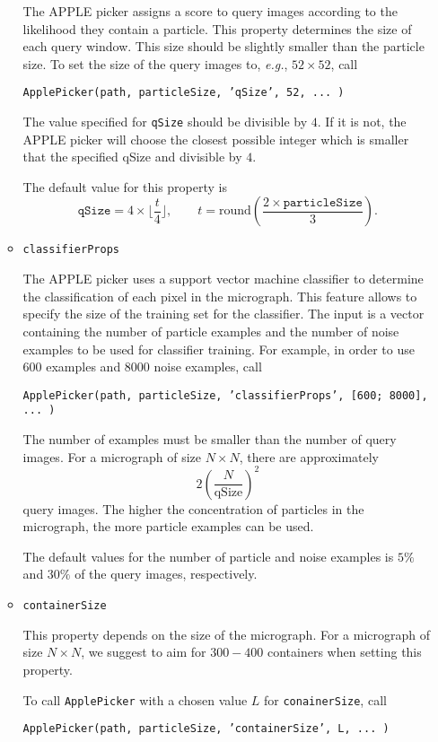 \documentclass[12pt,a4paper]{article}
\newcommand{\floor}[1]{\lfloor #1 \rfloor}
\begin{document}
\begin{itemize}[leftmargin=0.5cm]
\begin{itemize}[leftmargin=0.5cm]
The APPLE picker assigns a score to query images according to the likelihood they contain a particle. This property determines the size of each query window.
This size should be slightly smaller than the particle size. To set the size of the query images to, \textit{e.g.}, $52 \times 52$, call
\begin{center}
\texttt{ApplePicker(path, particleSize, 'qSize', 52, ... )}
\end{center}

The value specified for \texttt{qSize} should be divisible by $4$. If it is not, the APPLE picker will choose the closest possible integer which is smaller that the specified qSize and divisible by $4$.

The default value for this property is
$$\texttt{qSize} = 4 \times \floor{\frac{t}{4}}, \qquad t=\text{round}\left( \frac{2 \times \texttt{particleSize}}{3} \right).$$
\item \texttt{classifierProps}

The APPLE picker uses a support vector machine classifier to determine the classification of each pixel in the micrograph.  This feature allows to specify the size of the
training set for the classifier. The input is a vector containing the number of particle examples and the number of noise examples to be used for classifier training. For example, in order to
use $600$ examples and $8000$ noise examples, call
\begin{center}
\texttt{ApplePicker(path, particleSize, 'classifierProps', [600; 8000], ... )}
\end{center}

The number of examples must be smaller than the number of query images. For a micrograph of size $N \times N$,
there are approximately $$2 \left( \frac{N}{\text{qSize}} \right)^2$$ query images. The higher the concentration of
particles in the micrograph, the more particle examples can be used.

The default values for the number of particle and noise examples is $5\%$ and $30\%$ of the query images, respectively.

\item \texttt{containerSize}

This property depends on the size of the micrograph. For a micrograph of size $N \times N$, we suggest to aim for $300-400$ containers when setting this property.

To call \texttt{ApplePicker} with a chosen value $L$ for \texttt{conainerSize}, call
\begin{center}
\texttt{ApplePicker(path, particleSize, 'containerSize', L, ... )}
\end{center}


\end{itemize}
\end{itemize}
\end{document}
